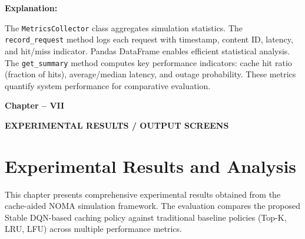 \documentclass[12pt,a4paper]{article}
\begin{document}
\textbf{Explanation:}

The \texttt{MetricsCollector} class aggregates simulation statistics. The \texttt{record\_request} method logs each request with timestamp, content ID, latency, and hit/miss indicator. Pandas DataFrame enables efficient statistical analysis. The \texttt{get\_summary} method computes key performance indicators: cache hit ratio (fraction of hits), average/median latency, and outage probability. These metrics quantify system performance for comparative evaluation.

\thispagestyle{plain}


\clearpage

\begin{center}
    \vspace*{10cm}
    
    {\fontsize{16}{19.2}\selectfont\bfseries
    Chapter -- VII}
    
    \vspace{1cm}
    
    {\fontsize{16}{19.2}\selectfont\bfseries
    EXPERIMENTAL RESULTS / OUTPUT SCREENS}
    
    \vspace*{\fill}
\end{center}

\thispagestyle{plain}


\clearpage

\section{Experimental Results and Analysis}

This chapter presents comprehensive experimental results obtained from the cache-aided NOMA simulation framework. The evaluation compares the proposed Stable DQN-based caching policy against traditional baseline policies (Top-K, LRU, LFU) across multiple performance metrics.
\end{document}
